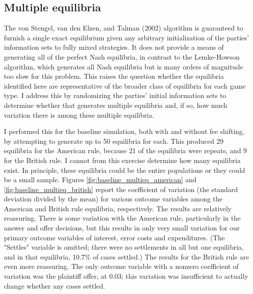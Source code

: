 \documentclass{article}
\begin{document}
\subsection{Multiple equilibria}

The von Stengel, van den Elzen, and Talman (2002) algorithm is guaranteed to furnish a single exact equilibrium given any arbitrary initialization of the parties' information sets to fully mixed strategies. It does not provide a means of generating all of the perfect Nash equilibria, in contrast to the Lemke-Howson algorithm, which generates all Nash equilibria but is many orders of magnitude too slow for this problem. This raises the question whether the equilibria identified here are representative of the broader class of equilibria for each game type. I address this by randomizing the parties' initial information sets to determine whether that generates multiple equilibria and, if so, how much variation there is among these multiple equilibria.

I performed this for the baseline simulation, both with and without fee shifting, by attempting to generate up to 50 equilibria for each. This produced 29 equilibria for the American rule, because 21 of the equilibria were repeats, and 9 for the British rule. I cannot from this exercise determine how many equilibria exist. In principle, these equilibria could be the entire populations or they could be a small sample. Figures \ref{fig:baseline_multieq_american} and \ref{fig:baseline_multieq_british} report the coefficient of variation (the standard deviation divided by the mean) for various outcome variables among the American and British rule equilibria, respectively. The results are relatively reassuring. There is some variation with the American rule, particularly in the answer and offer decisions, but this results in only very small variation for our primary outcome variables of interest, error costs and expenditures. (The "Settles" variable is omitted; there were no settlements in all but one equilibria, and in that equilibria, 10.7\% of cases settled.) The results for the British rule are even more reassuring. The only outcome variable with a nonzero coefficient of variation was the plaintiff offer, at 0.03; this variation was insufficient to actually change whether any cases settled. 
\end{document}
